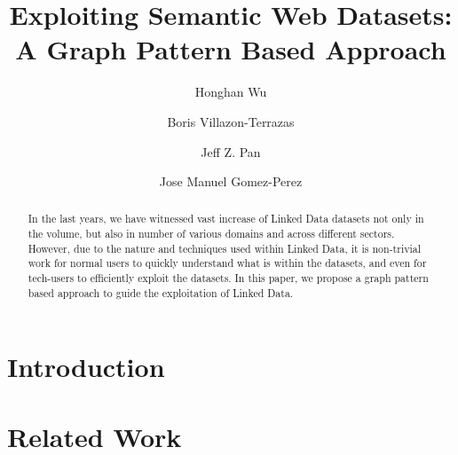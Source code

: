 \documentclass{llncs}
\begin{document}
%
\frontmatter          %
%
\pagestyle{headings}  %
%
%
\mainmatter              %
%
\title{Exploiting Semantic Web Datasets: A Graph Pattern Based Approach}

%
%
\author{Honghan Wu \and Boris Villazon-Terrazas \and Jeff Z. Pan \and Jose Manuel Gomez-Perez}
%
%
%


\maketitle              %



\begin{abstract}
In the last years, we have witnessed vast increase of Linked Data datasets not only in the volume, but also in number of various domains and across different sectors. However, due to the nature and techniques used within Linked Data, it is non-trivial work for normal users to quickly understand what is within the datasets, and even for tech-users to efficiently exploit the datasets. In this paper, we propose a graph pattern based approach to guide the exploitation of Linked Data. 
\end{abstract}

\vspace{-8mm}
\section{Introduction}\label{sec:Introduction}

\vspace{-8mm}
\section{Related Work}\label{sec:RelatedWork}

\end{document}
